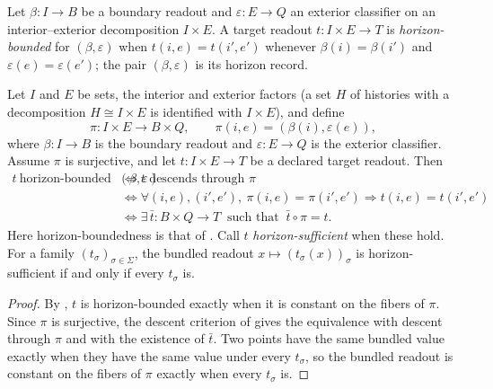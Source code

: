 \begin{definition}\label{def:horizon-bounded-support}
Let \(\beta:I\to B\) be a boundary readout and \(\varepsilon:E\to Q\) an
exterior classifier on an interior--exterior decomposition \(I\times E\). A
target readout \(t:I\times E\to T\) is \emph{horizon-bounded} for
\((\beta,\varepsilon)\) when \(t(i,e)=t(i',e')\) whenever \(\beta(i)=\beta(i')\)
and \(\varepsilon(e)=\varepsilon(e')\); the pair \((\beta,\varepsilon)\) is its
horizon record.
\end{definition}

\begin{theorem}\label{thm:F33}
Let \(I\) and \(E\) be sets, the interior and exterior factors (a set \(H\) of histories with a decomposition \(H\cong I\times E\) is identified with \(I\times E\)), and define
\[
  \pi : I \times E \longrightarrow B \times Q,
  \qquad
  \pi(i,e)=(\beta(i),\varepsilon(e)),
\]
where \(\beta:I\to B\) is the boundary readout and
\(\varepsilon:E\to Q\) is the exterior classifier. Assume \(\pi\) is
surjective, and let \(t:I\times E\to T\) be a declared target readout.
Then
\begin{align*}
  t\ \text{horizon-bounded for }(\beta,\varepsilon)
  &\iff
  t \text{ descends through }\pi\\
  &\iff
  \forall (i,e),(i',e'),\
    \pi(i,e)=\pi(i',e')\Rightarrow t(i,e)=t(i',e')\\
  &\iff
  \exists\,\bar t:B\times Q\to T\ \text{ such that }\
    \bar t\circ\pi=t .
\end{align*}
Here horizon-boundedness is that of . Call \(t\) \emph{horizon-sufficient}
when these hold. For a family \((t_\sigma)_{\sigma\in\Sigma}\), the bundled
readout \(x\mapsto(t_\sigma(x))_{\sigma}\) is horizon-sufficient if and only if
every \(t_\sigma\) is.
\end{theorem}
\begin{proof}
By , \(t\) is horizon-bounded exactly
when it is constant on the fibers of \(\pi\).  Since \(\pi\) is
surjective, the descent criterion of \Cref{sec:apparatus} gives the
equivalence with descent through \(\pi\) and with the existence of
\(\bar t\).  Two points have the same bundled value exactly when they
have the same value under every \(t_\sigma\), so the bundled readout is
constant on the fibers of \(\pi\) exactly when every \(t_\sigma\) is.
\end{proof}

